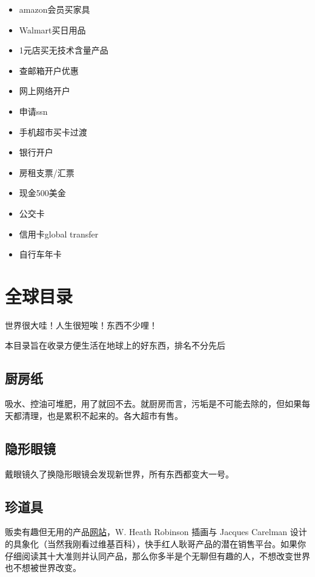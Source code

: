 \documentclass[
  letterpaper,
  DIV=11,
  numbers=noendperiod]{scrreprt}
\providecommand{\tightlist}{%
  \setlength{\itemsep}{0pt}\setlength{\parskip}{0pt}}\usepackage{longtable,booktabs,array}
\begin{document}
\begin{itemize}
\tightlist
\item
  amazon会员买家具
\item
  Walmart买日用品
\item
  1元店买无技术含量产品
\item
  查邮箱开户优惠
\item
  网上网络开户
\item
  申请ssn
\item
  手机超市买卡过渡
\item
  银行开户
\item
  房租支票/汇票
\item
  现金500美金
\item
  公交卡
\item
  信用卡global transfer
\item
  自行车年卡
\end{itemize}

\section{全球目录}\label{ux5168ux7403ux76eeux5f55}

世界很大哇！人生很短唉！东西不少哩！

本目录旨在收录方便生活在地球上的好东西，排名不分先后

\subsection{厨房纸}\label{ux53a8ux623fux7eb8}

吸水、控油可堆肥，用了就回不去。就厨房而言，污垢是不可能去除的，但如果每天都清理，也是累积不起来的。各大超市有售。

\subsection{隐形眼镜}\label{ux9690ux5f62ux773cux955c}

戴眼镜久了换隐形眼镜会发现新世界，所有东西都变大一号。

\subsection{珍道具}\label{ux73cdux9053ux5177}

贩卖有趣但无用的产品\href{http://www.chindogu.com/}{网站}，W. Heath
Robinson 插画与 Jacques Carelman
设计的具象化（当然我刚看过维基百科），快手红人耿哥产品的潜在销售平台。如果你仔细阅读其十大准则并认同产品，那么你多半是个无聊但有趣的人，不想改变世界也不想被世界改变。
\end{document}
